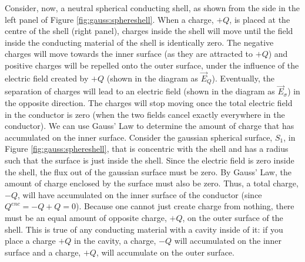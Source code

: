 Consider, now, a neutral spherical conducting shell, as shown from the side in the left panel of Figure \ref{fig:gauss:sphereshell}. When a charge, $+Q$, is placed at the centre of the shell (right panel), charges inside the shell will move until the field inside the conducting material of the shell is identically zero. The negative charges will move towards the inner surface (as they are attracted to $+Q$) and positive charges will be repelled onto the outer surface, under the influence of the electric field created by $+Q$ (shown in the diagram as $\vec E_{Q}$). Eventually, the separation of charges will lead to an electric field (shown in the diagram as $\vec E_{\sigma}$) in the opposite direction. The charges will stop moving once the total electric field in the conductor is zero (when the two fields cancel exactly everywhere in the conductor).
We can use Gauss' Law to determine the amount of charge that has accumulated on the inner surface. Consider the gaussian spherical surface, $S_1$, in Figure \ref{fig:gauss:sphereshell}, that is concentric with the shell and has a radius such that the surface is just inside the shell. Since the electric field is zero inside the shell, the flux out of the gaussian surface must be zero. By Gauss' Law, the amount of charge enclosed by the surface must also be zero. Thus, a total charge, $-Q$, will have accumulated on the inner surface of the conductor (since $Q^{enc}=-Q+Q=0$). Because one cannot just create charge from nothing, there must be an equal amount of opposite charge, $+Q$, on the outer surface of the shell. This is true of any conducting material with a cavity inside of it: if you place a charge $+Q$ in the cavity, a charge, $-Q$ will accumulated on the inner surface and a charge, $+Q$, will accumulate on the outer surface.

